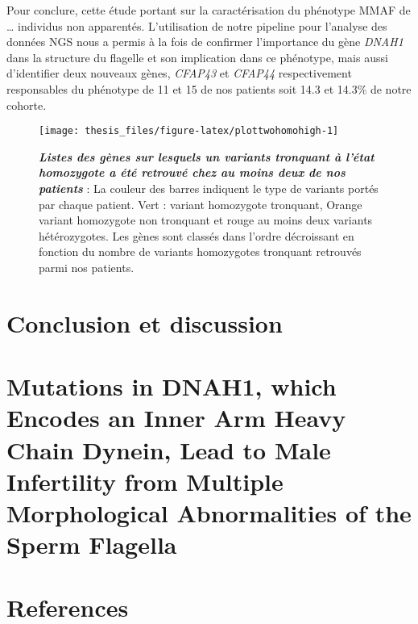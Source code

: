 \documentclass[12pt,twoside]{ugathesis}
\begin{document}
Pour conclure, cette étude portant sur la caractérisation du phénotype
MMAF de \ldots{} individus non apparentés. L'utilisation de notre
pipeline pour l'analyse des données NGS nous a permis à la fois de
confirmer l'importance du gène \emph{DNAH1} dans la structure du
flagelle et son implication dans ce phénotype, mais aussi d'identifier
deux nouveaux gènes, \emph{CFAP43} et \emph{CFAP44} respectivement
responsables du phénotype de 11 et 15 de nos patients soit 14.3 et
14.3\% de notre cohorte.

\newpage

\begin{figure}

{\centering \texttt{[image: thesis\_files/figure-latex/plottwohomohigh-1]} 

}

\caption[Listes des gènes sur lesquels un variants tronquant à l'état homozygote a été retrouvé chez au moins deux de nos patients]{\textbf{\emph{Listes des gènes sur lesquels un
variants tronquant à l'état homozygote a été retrouvé chez au moins deux
de nos patients}} : La couleur des barres indiquent le type de variants
portés par chaque patient. Vert : variant homozygote tronquant, Orange
variant homozygote non tronquant et rouge au moins deux variants
hétérozygotes. Les gènes sont classés dans l'ordre décroissant en
fonction du nombre de variants homozygotes tronquant retrouvés parmi nos
patients.}\label{fig:plottwohomohigh}
\end{figure}










\chapter*{Conclusion et discussion}\label{conclusion-et-discussion}

\hypertarget{dnah12014}{\chapter{Mutations in DNAH1, which Encodes an
Inner Arm Heavy Chain Dynein, Lead to Male Infertility from Multiple
Morphological Abnormalities of the Sperm Flagella}\label{dnah12014}}

\chapter*{References}\label{references}
\end{document}

